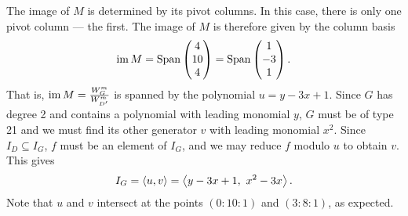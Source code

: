 The image of $M$ is determined by its pivot columns.
In this case, there is only one pivot column --- the first.
The image of $M$ is therefore given by the column basis
\[ \operatorname{im} M = \operatorname{Span} \begin{pmatrix} 4 \\ 10 \\ 4 \end{pmatrix}
         = \operatorname{Span} \begin{pmatrix} 1 \\ -3 \\ 1 \end{pmatrix}. \]
That is, $\operatorname{im} M = \frac {W_G^m}{W_{D'}^m}$ is spanned by the polynomial $u = y - 3x + 1$.
Since $G$ has degree 2 and contains a polynomial with leading monomial $y$,
$G$ must be of type 21 and we must find its other generator $v$ with leading monomial $x^2$.
Since $I_D \subseteq I_G$, $f$ must be an element of $I_G$, and we may reduce $f$ modulo $u$ to obtain $v$.
This gives
  \[ I_G = \left\langle u,v \right\rangle = \left\langle y - 3x + 1, ~x^2 - 3x \right\rangle. \]
Note that $u$ and $v$ intersect at the points $(0 : 10 : 1)$ and $(3 : 8 : 1)$, as expected.
